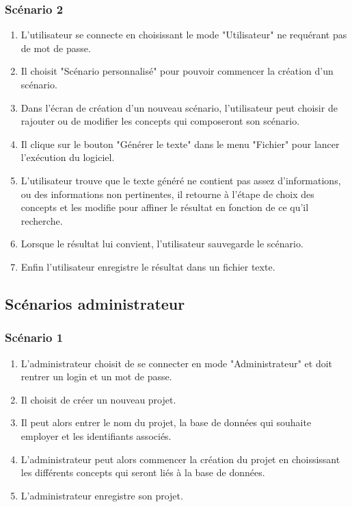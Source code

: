 \documentclass[12pt]{report}
\begin{document}
\subsubsection{Scénario 2}
    \begin{enumerate}
    		\item L'utilisateur se connecte en choisissant le mode "Utilisateur" ne requérant pas de mot de passe.
           \item Il choisit "Scénario personnalisé" pour pouvoir commencer la création d'un scénario.
           	\item Dans l'écran de création d'un nouveau scénario, l'utilisateur peut choisir de rajouter ou de modifier les concepts qui composeront son scénario.
            \item Il clique sur le bouton "Générer le texte" dans le menu "Fichier" pour lancer l'exécution du logiciel.
            \item L'utilisateur trouve que le texte généré ne contient pas assez d'informations, ou des informations non pertinentes, il retourne à l'étape de choix des concepts et les modifie pour affiner le résultat en fonction de ce qu'il recherche.
            \item Lorsque le résultat lui convient, l'utilisateur sauvegarde le scénario.
            \item Enfin l'utilisateur enregistre le résultat dans un fichier texte.
            \end{enumerate}


\subsection{Scénarios administrateur}

\subsubsection{Scénario 1}
    \begin{enumerate}
    \item L'administrateur choisit de se connecter en mode "Administrateur" et doit rentrer un login et un mot de passe.
            \item Il choisit de créer un nouveau projet.
            \item Il peut alors entrer le nom du projet, la base de données qui souhaite employer et les identifiants associés.
            \item L'administrateur peut alors commencer la création du projet en choississant les différents concepts qui seront liés à la base de données.
            \item L'administrateur enregistre son projet.
            \end{enumerate}
\end{document}
